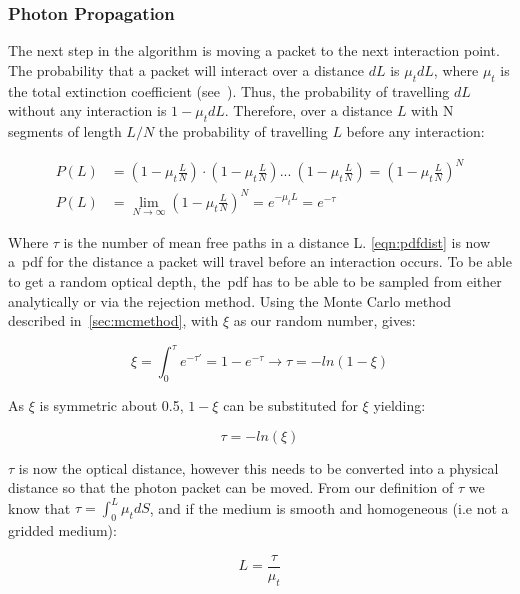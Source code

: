 \subsubsection*{Photon Propagation}\label{sec:photmove}

The next step in the algorithm is moving a packet to the next interaction point. The probability that a packet will interact over a distance $dL$ is $\mu_tdL$, where $\mu_t$ is the total extinction coefficient (see~). Thus, the probability of travelling $dL$ without any interaction is $1-\mu_tdL$. Therefore, over a distance $L$ with N segments of length $L/N$ the probability of travelling $L$ before any interaction:

\begin{align}
P(L) &= (1-\mu_t\frac{L}{N}) \cdot (1-\mu_t\frac{L}{N}) ...\ (1-\mu_t\frac{L}{N}) = (1-\mu_t\frac{L}{N})^N \\
P(L) &= \lim_{N \to \infty}(1-\mu_t\frac{L}{N})^N=e^{-\mu_tL}=e^{-\tau}\label{eqn:pdfdist}
\end{align}

Where $\tau$ is the number of mean free paths in a distance L. \cref{eqn:pdfdist} is now a~\gls*{pdf} for the distance a packet will travel before an interaction occurs. To be able to get a random optical depth, the~\gls*{pdf} has to be able to be sampled from either analytically or via the rejection method.
Using the Monte Carlo method described in~\cref{sec:mcmethod}, with $\xi$ as our random number, gives:

\begin{equation}
\xi=\int_{0}^{\tau}e^{-\tau'}=1-e^{-\tau}\rightarrow \tau=-ln(1-\xi)
\end{equation}

As $\xi$ is symmetric about 0.5, $1-\xi$ can be substituted for $\xi$ yielding:

\begin{equation}
\tau=-ln(\xi)\label{eqn:taueqn}
\end{equation} 

$\tau$ is now the optical distance, however this needs to be converted into a physical distance so that the photon packet can be moved. From our definition of $\tau$ we know that $\tau=\int_0^L\mu_tdS$, and if the medium is smooth and homogeneous (i.e not a gridded medium): 

\begin{equation}
L=\frac{\tau}{\mu_t}\label{eqn:physicaldist}
\end{equation}


